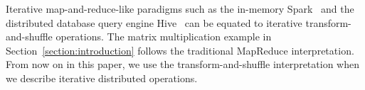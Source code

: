 \documentclass[10pt,journal,compsoc]{IEEEtran}
\begin{document}



Iterative map-and-reduce-like paradigms such as the in-memory %
Spark~\cite{zaharia2012resilient} and the distributed database query
engine Hive~\cite{thusoo2009hive} can be equated to iterative transform-and-shuffle operations.
The matrix multiplication example in Section~\ref{section:introduction}
follows the traditional MapReduce interpretation. 
From now on in this paper, we use the transform-and-shuffle interpretation when we describe iterative distributed operations.



\end{document}
